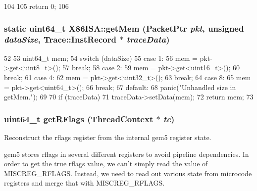\begin{DoxyCode}
104     {
105         return 0;
106     }
\end{DoxyCode}
\hypertarget{namespaceX86ISA_a71e49bc75208629f6958a8479a19bb22}{
\subsubsection[{getMem}]{\setlength{\rightskip}{0pt plus 5cm}static uint64\_\-t X86ISA::getMem ({\bf PacketPtr} {\em pkt}, \/  unsigned {\em dataSize}, \/  {\bf Trace::InstRecord} $\ast$ {\em traceData})}}
\label{namespaceX86ISA_a71e49bc75208629f6958a8479a19bb22}



\begin{DoxyCode}
52 {
53     uint64_t mem;
54     switch (dataSize) {
55       case 1:
56         mem = pkt->get<uint8_t>();
57         break;
58       case 2:
59         mem = pkt->get<uint16_t>();
60         break;
61       case 4:
62         mem = pkt->get<uint32_t>();
63         break;
64       case 8:
65         mem = pkt->get<uint64_t>();
66         break;
67       default:
68         panic("Unhandled size in getMem.\n");
69     }
70     if (traceData)
71         traceData->setData(mem);
72     return mem;
73 }
\end{DoxyCode}
\hypertarget{namespaceX86ISA_ab5e0d51a18a3bce3397edd01a4b51492}{
\subsubsection[{getRFlags}]{\setlength{\rightskip}{0pt plus 5cm}uint64\_\-t getRFlags ({\bf ThreadContext} $\ast$ {\em tc})}}
\label{namespaceX86ISA_ab5e0d51a18a3bce3397edd01a4b51492}
Reconstruct the rflags register from the internal gem5 register state.

gem5 stores rflags in several different registers to avoid pipeline dependencies. In order to get the true rflags value, we can't simply read the value of MISCREG\_\-RFLAGS. Instead, we need to read out various state from microcode registers and merge that with MISCREG\_\-RFLAGS.



